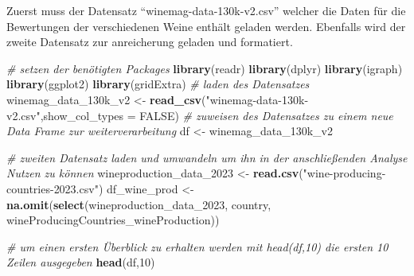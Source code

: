 \documentclass[
]{article}
\newenvironment{Shaded}{\begin{snugshade}}{\end{snugshade}}
\newcommand{\AttributeTok}[1]{\textcolor[rgb]{0.13,0.29,0.53}{#1}}
\newcommand{\CommentTok}[1]{\textcolor[rgb]{0.56,0.35,0.01}{\textit{#1}}}
\newcommand{\ConstantTok}[1]{\textcolor[rgb]{0.56,0.35,0.01}{#1}}
\newcommand{\DecValTok}[1]{\textcolor[rgb]{0.00,0.00,0.81}{#1}}
\newcommand{\FunctionTok}[1]{\textcolor[rgb]{0.13,0.29,0.53}{\textbf{#1}}}
\newcommand{\NormalTok}[1]{#1}
\newcommand{\OtherTok}[1]{\textcolor[rgb]{0.56,0.35,0.01}{#1}}
\newcommand{\StringTok}[1]{\textcolor[rgb]{0.31,0.60,0.02}{#1}}
\begin{document}
Zuerst muss der Datensatz ``winemag-data-130k-v2.csv'' welcher die Daten
für die Bewertungen der verschiedenen Weine enthält geladen werden.
Ebenfalls wird der zweite Datensatz zur anreicherung geladen und
formatiert.

\begin{Shaded}
\begin{Highlighting}[]
\CommentTok{\# setzen der benötigten Packages }
\FunctionTok{library}\NormalTok{(readr)}
\FunctionTok{library}\NormalTok{(dplyr)}
\FunctionTok{library}\NormalTok{(igraph)}
\FunctionTok{library}\NormalTok{(ggplot2)}
\FunctionTok{library}\NormalTok{(gridExtra)}
\CommentTok{\# laden des Datensatzes}
\NormalTok{winemag\_data\_130k\_v2 }\OtherTok{\textless{}{-}} \FunctionTok{read\_csv}\NormalTok{(}\StringTok{"winemag{-}data{-}130k{-}v2.csv"}\NormalTok{,}\AttributeTok{show\_col\_types =} \ConstantTok{FALSE}\NormalTok{)}
\CommentTok{\# zuweisen des Datensatzes zu einem neue Data Frame zur weiterverarbeitung}
\NormalTok{df }\OtherTok{\textless{}{-}}\NormalTok{ winemag\_data\_130k\_v2}

\CommentTok{\# zweiten Datensatz laden und umwandeln um ihn in der anschließenden Analyse Nutzen zu können}
\NormalTok{wineproduction\_data\_2023 }\OtherTok{\textless{}{-}} \FunctionTok{read.csv}\NormalTok{(}\StringTok{"wine{-}producing{-}countries{-}2023.csv"}\NormalTok{)}
\NormalTok{df\_wine\_prod }\OtherTok{\textless{}{-}} \FunctionTok{na.omit}\NormalTok{(}\FunctionTok{select}\NormalTok{(wineproduction\_data\_2023, country, wineProducingCountries\_wineProduction))}
\end{Highlighting}
\end{Shaded}

\begin{Shaded}
\begin{Highlighting}[]
\CommentTok{\# um einen ersten Überblick zu erhalten werden mit head(df,10) die ersten 10 Zeilen ausgegeben}
\FunctionTok{head}\NormalTok{(df,}\DecValTok{10}\NormalTok{)}
\end{Highlighting}
\end{Shaded}
\end{document}
